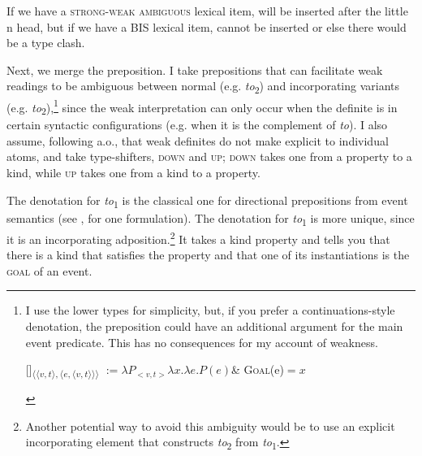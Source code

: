 \documentclass[output=paper,
modfonts
]{langscibook}
\begin{document}
If we have a \textsc{strong-weak ambiguous} lexical item,  will be inserted after the little n head, but if we have a BIS lexical item,  cannot be inserted or else there would be a type clash. 

Next, we merge the preposition. I take prepositions that can facilitate weak readings  to be ambiguous between normal (e.g. \textit{to}\textsubscript{2}) and incorporating variants (e.g. \textit{to}\textsubscript{2}),\footnote{I use the lower types for simplicity, but, if you prefer a continuations-style denotation, the preposition could have an additional argument for the main event predicate. This has no consequences for my account of weakness.\largerpage[2]
\begin{exe}
 \textnormal{[\!]\textsubscript{$\langle \langle v,t \rangle,\langle e,\langle v,t\rangle \rangle \rangle$} $:= \lambda P_{<v,t>} \lambda x. \lambda e.P(e) $\& \textsc{Goal}(e)$=x $}
\end{exe}} since the weak interpretation can only occur when the definite is in certain syntactic configurations (e.g. when it is the complement of \textit{to}). I also assume, following \citet{Aguilar-Guevara2014} a.o., that weak definites do not make explicit  to individual atoms, and take  type-shifters, \textsc{down} and \textsc{up}; \textsc{down} takes one from a property to a kind, while \textsc{up} takes one from a kind to a property. 

\begin{exe}
\end{exe}

The denotation for \textit{to}\textsubscript{1} is the classical one for directional prepositions from event semantics (see \citealt[57]{Champollion2017}, for one formulation). The denotation for \textit{to}\textsubscript{1} is more unique, since it is an incorporating adposition.\footnote{Another potential way to avoid this ambiguity would be to use an explicit incorporating element that constructs \textit{to}\textsubscript{2} from \textit{to}\textsubscript{1}.} It takes a kind property and tells you that there is a kind that satisfies the property and that one of its instantiations is the \textsc{goal} of an event.
\end{document}
